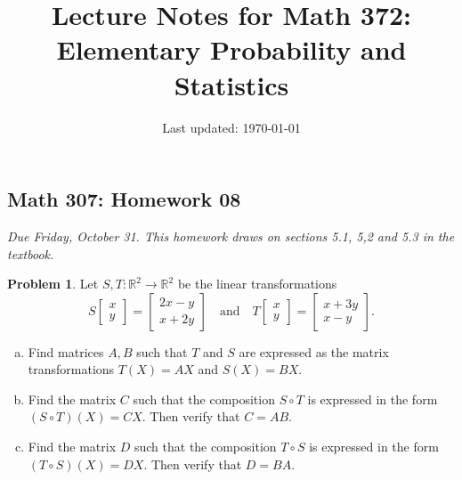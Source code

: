 \documentclass[10pt]{article}
\title{Lecture Notes for Math 372: \\Elementary Probability and Statistics}
\date{Last updated: \today}
\theoremstyle{definition}
\newtheorem{problem}[theorem]{Problem}
\newcommand{\1}[1]{\textbf{1}_{\left[#1\right]}} %
\def\R{\mathbb{R}} %
\begin{document}
\begin{center}
  \section*{Math 307: Homework 08}
  \textit{Due Friday, October 31. This homework draws on sections
    5.1, 5,2 and 5.3 in the textbook.}
\end{center}



\begin{problem}
  Let $S,T:\R^{2} \to \R^{2}$ be the linear transformations
  \begin{equation*}
    S
    \begin{bmatrix}
      x\\y
    \end{bmatrix}
    =
    \begin{bmatrix}
      2x-y\\x+2y
    \end{bmatrix}
    \quad \text{and} \quad
    T
    \begin{bmatrix}
      x\\y
    \end{bmatrix}
    =
    \begin{bmatrix}
      x+3y\\x-y
    \end{bmatrix}.
  \end{equation*}
  \begin{enumerate}[(a)]
    \setlength{\itemsep}{0pt}
    \item Find matrices $A,B$ such that $T$ and $S$ are expressed as the
    matrix transformations $T(X)=AX$ and $S(X) = BX$.
    \item Find the matrix $C$ such that the composition $S\circ T$ is
    expressed in the form $(S\circ T)(X)=CX$. Then verify that $C=AB$.
    \item Find the matrix $D$ such that the composition $T\circ S$ is
    expressed in the form $(T\circ S)(X)=DX$. Then verify that $D=BA$.
  \end{enumerate}
\end{problem}
\end{document}
